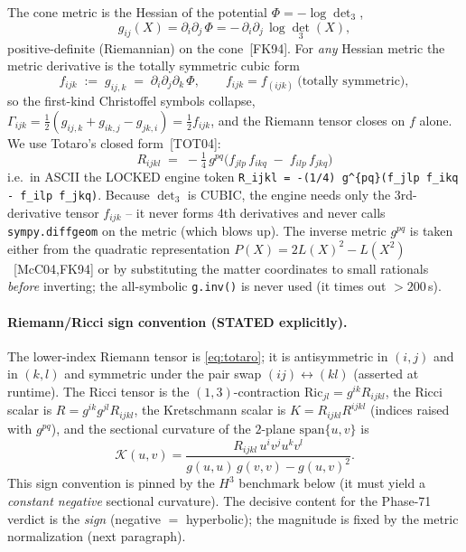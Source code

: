 The cone metric is the Hessian of the potential $\Phi = -\log\det_3$,
\begin{equation}
  g_{ij}(X) = \partial_i\partial_j\,\Phi
            = -\,\partial_i\partial_j\,\log\det_3(X),
  \label{eq:cone-metric-71}
\end{equation}
positive-definite (Riemannian) on the cone~[FK94]. For \emph{any} Hessian metric
the metric derivative is the totally symmetric cubic form
\begin{equation}
  f_{ijk} \;:=\; g_{ij,k} \;=\; \partial_i\partial_j\partial_k\,\Phi,
  \qquad f_{ijk} = f_{(ijk)}\ \text{(totally symmetric)},
  \label{eq:cubic-form}
\end{equation}
so the first-kind Christoffel symbols collapse,
$\Gamma_{ijk} = \tfrac12(g_{ij,k}+g_{ik,j}-g_{jk,i}) = \tfrac12 f_{ijk}$, and the
Riemann tensor closes on $f$ alone. We use Totaro's closed form~[TOT04]:
\begin{equation}
  \boxed{\,R_{ijkl} \;=\; -\tfrac14\, g^{pq}\big(f_{jlp}\,f_{ikq} \;-\; f_{ilp}\,f_{jkq}\big)\,}
  \label{eq:totaro}
\end{equation}
i.e.\ in ASCII the LOCKED engine token
\verb|R_ijkl = -(1/4) g^{pq}(f_jlp f_ikq - f_ilp f_jkq)|.
Because $\det_3$ is CUBIC, the engine needs only the 3rd-derivative tensor
$f_{ijk}$ -- it never forms 4th derivatives and never calls \texttt{sympy.diffgeom}
on the metric (which blows up). The inverse metric $g^{pq}$ is taken either from the
quadratic representation $P(X) = 2L(X)^2 - L(X^2)$~[McC04,FK94] or by substituting
the matter coordinates to small rationals \emph{before} inverting; the
all-symbolic \texttt{g.inv()} is never used (it times out $>200$\,s).

\paragraph{Riemann/Ricci sign convention (STATED explicitly).}
The lower-index Riemann tensor is \eqref{eq:totaro}; it is antisymmetric in
$(i,j)$ and in $(k,l)$ and symmetric under the pair swap $(ij)\leftrightarrow(kl)$
(asserted at runtime). The Ricci tensor is the $(1,3)$-contraction
$\mathrm{Ric}_{jl} = g^{ik} R_{ijkl}$, the Ricci scalar is
$R = g^{ik}g^{jl} R_{ijkl}$, the Kretschmann scalar is
$K = R_{ijkl}R^{ijkl}$ (indices raised with $g^{pq}$), and the sectional curvature
of the $2$-plane $\mathrm{span}\{u,v\}$ is
\begin{equation}
  \mathcal{K}(u,v) = \frac{R_{ijkl}\,u^i v^j u^k v^l}
                          {g(u,u)\,g(v,v)-g(u,v)^2}.
  \label{eq:sectional}
\end{equation}
This sign convention is pinned by the $H^3$ benchmark below (it must yield a
\emph{constant negative} sectional curvature). The decisive content for the
Phase-71 verdict is the \emph{sign} (negative $=$ hyperbolic); the magnitude is
fixed by the metric normalization (next paragraph).

